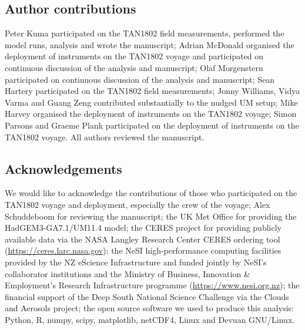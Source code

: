 

\clearpage

\fontsize{10pt}{12pt}
\sffamily

\subsection*{Author contributions}

Peter Kuma participated on the TAN1802 field measurements, performed the model runs, analysis and wrote the manuscript;
Adrian McDonald organised the deployment of instruments on the TAN1802 voyage and participated on continuous discussion of the analysis
and manuscript;
Olaf Morgenstern participated on continuous discussion of the analysis and
manuscript;
Sean Hartery participated on the TAN1802 field measurements;
Jonny Williams, Vidya Varma and Guang Zeng contributed substantially to the
nudged UM setup;
Mike Harvey organised the deployment of instruments on the TAN1802 voyage;
Simon Parsons and Graeme Plank participated on the deployment of instruments on the TAN1802
voyage. All authors reviewed the manuscript.

\subsection*{Acknowledgements}

We would like to acknowledge the contributions of those who participated on
the TAN1802 voyage and deployment, especially the crew of the voyage;
Alex Schuddeboom for reviewing the manuscript; the UK Met
Office for providing the HadGEM3-GA7.1/UM11.4 model;
the CERES project for providing publicly available data via the NASA Langley
Research Center CERES ordering tool (\url{https://ceres.larc.nasa.gov});
the
NeSI high-performance computing facilities
provided by the NZ eScience Infrastructure and funded jointly by NeSI's
collaborator institutions and the Ministry of Business, Innovation \&
Employment's Research Infrastructure programme (\url{https://www.nesi.org.nz});
the financial support of the Deep South National Science Challenge via the Clouds and
Aerosols project; the open source software we used to produce this analysis: Python, R,
numpy, scipy, matplotlib,
netCDF4, Linux and Devuan GNU/Linux.

\normalfont
\normalsize
